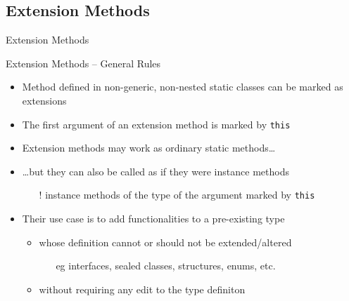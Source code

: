 \documentclass[presentation]{beamer}
\begin{document}
\subsection{Extension Methods}

\begin{frame}[allowframebreaks]{Extension Methods}
  \begin{block}{Extension Methods -- General Rules}
    \begin{itemize}
      \item Method defined in non-generic, non-nested static classes can be marked as extensions
      \item The first argument of an extension method is marked by \texttt{this}
      \item Extension methods may work as ordinary static methods\ldots
      \item \ldots but they can also be called as if they were instance methods
      \begin{itemize}
        \item[!] instance methods of the type of the argument marked by \texttt{this}
      \end{itemize}
      \item Their use case is to add functionalities to a pre-existing type
      \begin{itemize}
        \item whose definition cannot or should not be extended/altered
        \begin{itemize}
          \item[eg] interfaces, sealed classes, structures, enums, etc.
        \end{itemize}
        \item without requiring any edit to the type definiton
      \end{itemize}
    \end{itemize}
  \end{block}

  \framebreak


\end{frame}
\end{document}
